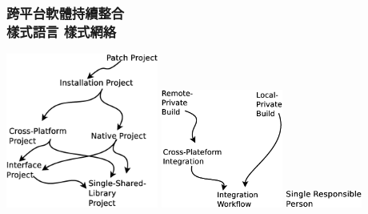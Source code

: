 \documentclass[utf8x]{beamer}
\begin{document}
\begin{frame}
\frametitle{跨平台軟體持續整合\\樣式語言 \textendash\hspace{6pt}樣式網絡}
\includegraphics[width=5cm]{project-catgory-pattern-language-network.eps}
\includegraphics[width=4cm]{build-catgory-pattern-language-network.eps}
\includegraphics[width=2.5cm]{goodhabit-pattern-language.eps}
\end{frame}
\end{document}
